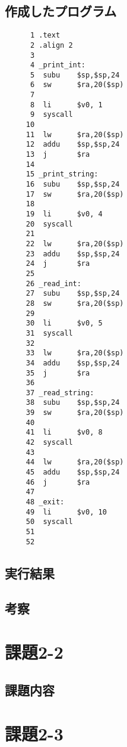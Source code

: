\documentclass[a4j,11pt]{jarticle}
\begin{document}
\subsection{作成したプログラム}
\begin{verbatim}
      1	.text
      2	.align 2
      3	
      4	_print_int:
      5	 subu    $sp,$sp,24
      6	 sw      $ra,20($sp)
      7	
      8	 li      $v0, 1
      9	 syscall
     10	
     11	 lw      $ra,20($sp)
     12	 addu    $sp,$sp,24
     13	 j       $ra 
     14	
     15	_print_string:
     16	 subu    $sp,$sp,24
     17	 sw      $ra,20($sp)
     18	
     19	 li      $v0, 4
     20	 syscall
     21	
     22	 lw      $ra,20($sp)
     23	 addu    $sp,$sp,24
     24	 j       $ra 
     25	
     26	_read_int:
     27	 subu    $sp,$sp,24
     28	 sw      $ra,20($sp)
     29	
     30	 li      $v0, 5
     31	 syscall
     32	
     33	 lw      $ra,20($sp)
     34	 addu    $sp,$sp,24
     35	 j       $ra 
     36	
     37	_read_string:
     38	 subu    $sp,$sp,24
     39	 sw      $ra,20($sp)
     40	
     41	 li      $v0, 8
     42	 syscall
     43	
     44	 lw      $ra,20($sp)
     45	 addu    $sp,$sp,24
     46	 j       $ra
     47	
     48	_exit:
     49	 li      $v0, 10
     50	 syscall
     51	
     52	       
\end{verbatim}

\subsection{実行結果}


\subsection{考察}



\section{課題2-2}

\subsection{課題内容}

\section{課題2-3}
\end{document}
